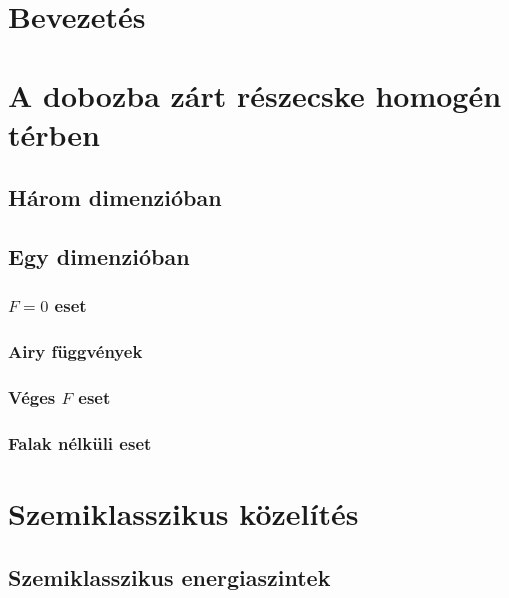 \documentclass[pdftex,12pt,a4paper]{article}
\begin{document}
\addtolength{\marginparwidth}{50pt}



\newpage
{}
{}
\tableofcontents
\listoffigures
\listoftables
\newpage
{}

\section{Bevezetés}
	
\section{A dobozba zárt részecske homogén térben}
	
	\subsection{Három dimenzióban}
		
	\subsection{Egy dimenzióban}
			
		\subsubsection{$F=0$ eset}
			
		\subsubsection{Airy függvények}
			
		\subsubsection{Véges $F$ eset}
			
		\subsubsection{Falak nélküli eset}
			
\section{Szemiklasszikus közelítés}
	
	\subsection{Szemiklasszikus energiaszintek}
		
\end{document}
